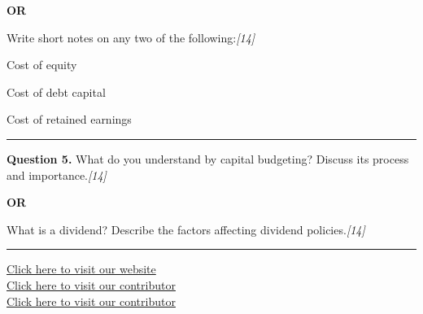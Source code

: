 \documentclass[11pt,a4paper]{article}
\newcommand{\pts}[1]{\hfill   \textit{[#1]}}
\begin{document}
\centerline{   \textbf{OR}}

Write short notes on any two of the following:\pts{14}

\begin{parts}
  \item Cost of equity
  \item Cost of debt capital
  \item Cost of retained earnings
\end{parts}

\medskip\rule{\linewidth}{0.2pt}




\noindent   \textbf{Question 5.}
What do you understand by capital budgeting? Discuss its process and importance.\pts{14}

\centerline{   \textbf{OR}}

What is a dividend? Describe the factors affecting dividend policies.\pts{14}

\vfill
\rule{\linewidth}{0.4pt}

\begin{center}\small
\href{https://bhu-exam.vercel.app/}{Click here to visit our website}\\[4pt]
\href{https://me-aryan.vercel.app/}{Click here to visit our contributor}\\[4pt]
\href{https://quashan-me.vercel.app/}{Click here to visit our contributor}
\end{center}
\end{document}
